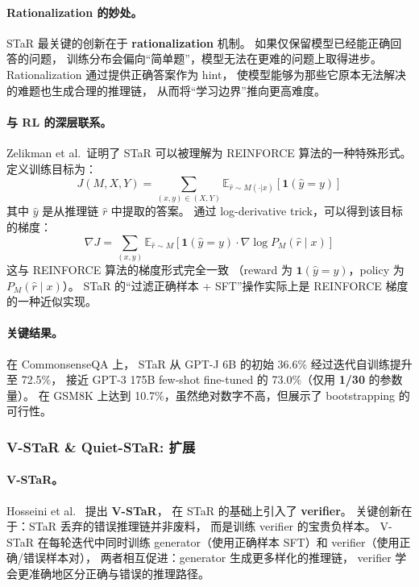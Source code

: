 \paragraph{Rationalization 的妙处。}
STaR 最关键的创新在于 \textbf{rationalization} 机制。
如果仅保留模型已经能正确回答的问题，
训练分布会偏向``简单题''，模型无法在更难的问题上取得进步。
Rationalization 通过提供正确答案作为 hint，
使模型能够为那些它原本无法解决的难题也生成合理的推理链，
从而将``学习边界''推向更高难度。

\paragraph{与 RL 的深层联系。}
Zelikman et al.\ 证明了 STaR 可以被理解为 REINFORCE 算法的一种特殊形式。
定义训练目标为：
\begin{equation}
\label{eq:star-rl}
J(M, X, Y) = \sum_{(x,y) \in (X,Y)} \mathbb{E}_{\hat{r} \sim M(\cdot|x)}
\left[ \mathbf{1}(\hat{y} = y) \right]
\end{equation}
其中 $\hat{y}$ 是从推理链 $\hat{r}$ 中提取的答案。
通过 log-derivative trick，可以得到该目标的梯度：
\begin{equation}
\label{eq:star-gradient}
\nabla J = \sum_{(x,y)} \mathbb{E}_{\hat{r} \sim M}
\left[ \mathbf{1}(\hat{y} = y) \cdot \nabla \log P_M(\hat{r} \mid x) \right]
\end{equation}
这与 REINFORCE 算法的梯度形式完全一致
（reward 为 $\mathbf{1}(\hat{y} = y)$，policy 为 $P_M(\hat{r} \mid x)$）。
STaR 的``过滤正确样本 + SFT''操作实际上是 REINFORCE 梯度的一种近似实现。

\paragraph{关键结果。}
在 CommonsenseQA 上，
STaR 从 GPT-J 6B 的初始 36.6\% 经过迭代自训练提升至 72.5\%，
接近 GPT-3 175B few-shot fine-tuned 的 73.0\%（仅用 \textbf{1/30} 的参数量）。
在 GSM8K 上达到 10.7\%，虽然绝对数字不高，但展示了 bootstrapping 的可行性。

\subsubsection{V-STaR \& Quiet-STaR: 扩展}

\paragraph{V-STaR。}
Hosseini et al.\ \cite{hosseini2024vstar} 提出 \textbf{V-STaR}，
在 STaR 的基础上引入了 \textbf{verifier}。
关键创新在于：STaR 丢弃的错误推理链并非废料，
而是训练 verifier 的宝贵负样本。
V-STaR 在每轮迭代中同时训练 generator（使用正确样本 SFT）和 verifier（使用正确/错误样本对），
两者相互促进：generator 生成更多样化的推理链，
verifier 学会更准确地区分正确与错误的推理路径。

